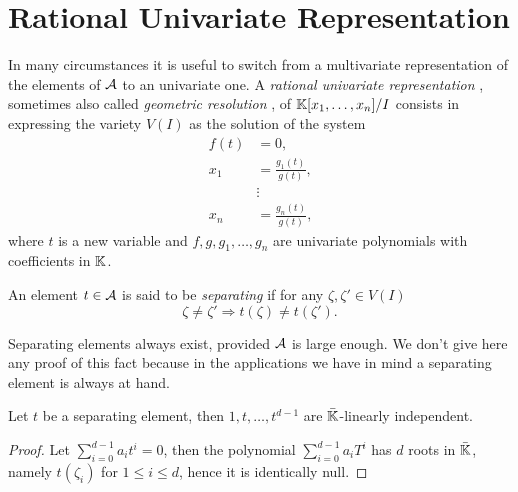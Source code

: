 \section{Rational Univariate Representation}
\label{sec:rati-univ-repr}
In many circumstances it is useful to switch from a multivariate
representation of the elements of $\mathcal{A}$ to an univariate one. A
\emph{rational univariate representation} \cite{rouiller99}, sometimes
also called \emph{geometric resolution} \cite{giusti+lecerf+salvy01},
of $\mathbb{K}[x_1,\ldots,x_n]/I$ consists in expressing the variety $V(I)$ as
the solution of the system
\begin{equation}
  \label{eq:22}
  \begin{aligned}
    f(t) &= 0\text{,}\\
    x_1 &= \frac{g_1(t)}{g(t)}\text{,}\\
    &\vdots\\
    x_n &= \frac{g_n(t)}{g(t)}\text{,}    
  \end{aligned}
\end{equation}
where $t$ is a new variable and $f,g,g_1,\ldots,g_n$ are univariate
polynomials with coefficients in $\mathbb{K}$.

\begin{definition}
  An element $t\in\mathcal{A}$ is said to be \emph{separating} if for
  any $\zeta,\zeta'\in V(I)$
  \[\zeta\ne\zeta'\Rightarrow t(\zeta)\ne t(\zeta')\text{.}\]
\end{definition}

Separating elements always exist, provided $\mathcal{A}$ is large
enough. We don't give here any proof of this fact because in the
applications we have in mind a separating element is always at hand.

\begin{proposition}
  Let $t$ be a separating element, then $1,t,\ldots,t^{d-1}$ are
  $\bar{\mathbb{K}}$-linearly independent.
\end{proposition}
\begin{proof}
  Let $\sum_{i=0}^{d-1}a_it^i =0$, then the polynomial
  $\sum_{i=0}^{d-1}a_iT^i$ has $d$ roots in $\bar{\mathbb{K}}$, namely
  $t(\zeta_i)$ for $1\le i \le d$, hence it is identically null.
\end{proof}

